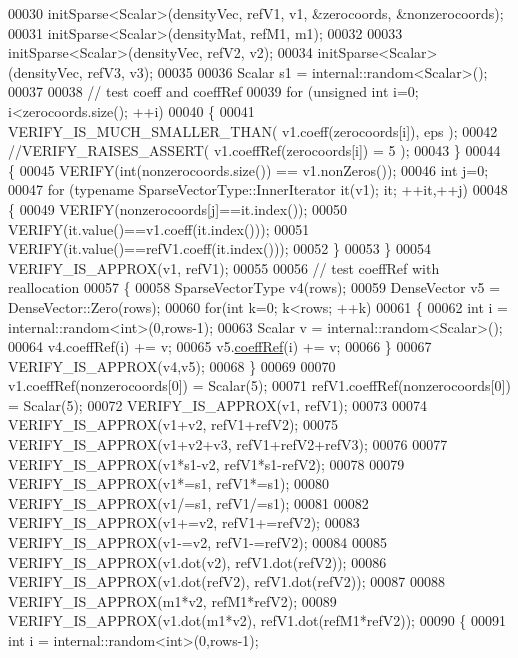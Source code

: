 \begin{DoxyCode}
00030   initSparse<Scalar>(densityVec, refV1, v1, &zerocoords, &nonzerocoords);
00031   initSparse<Scalar>(densityMat, refM1, m1);
00032 
00033   initSparse<Scalar>(densityVec, refV2, v2);
00034   initSparse<Scalar>(densityVec, refV3, v3);
00035 
00036   Scalar s1 = internal::random<Scalar>();
00037 
00038   \textcolor{comment}{// test coeff and coeffRef}
00039   \textcolor{keywordflow}{for} (\textcolor{keywordtype}{unsigned} \textcolor{keywordtype}{int} i=0; i<zerocoords.size(); ++i)
00040   \{
00041     VERIFY\_IS\_MUCH\_SMALLER\_THAN( v1.coeff(zerocoords[i]), eps );
00042     \textcolor{comment}{//VERIFY\_RAISES\_ASSERT( v1.coeffRef(zerocoords[i]) = 5 );}
00043   \}
00044   \{
00045     VERIFY(\textcolor{keywordtype}{int}(nonzerocoords.size()) == v1.nonZeros());
00046     \textcolor{keywordtype}{int} j=0;
00047     \textcolor{keywordflow}{for} (\textcolor{keyword}{typename} SparseVectorType::InnerIterator it(v1); it; ++it,++j)
00048     \{
00049       VERIFY(nonzerocoords[j]==it.index());
00050       VERIFY(it.value()==v1.coeff(it.index()));
00051       VERIFY(it.value()==refV1.coeff(it.index()));
00052     \}
00053   \}
00054   VERIFY\_IS\_APPROX(v1, refV1);
00055   
00056   \textcolor{comment}{// test coeffRef with reallocation}
00057   \{
00058     SparseVectorType v4(rows);
00059     DenseVector v5 = DenseVector::Zero(rows);
00060     \textcolor{keywordflow}{for}(\textcolor{keywordtype}{int} k=0; k<rows; ++k)
00061     \{
00062       \textcolor{keywordtype}{int} i = internal::random<int>(0,rows-1);
00063       Scalar v = internal::random<Scalar>();
00064       v4.coeffRef(i) += v;
00065       v5.\hyperlink{class_eigen_1_1_plain_object_base_a25626a55b26a4323565f79d1b7c48ea8}{coeffRef}(i) += v;
00066     \}
00067     VERIFY\_IS\_APPROX(v4,v5);
00068   \}
00069 
00070   v1.coeffRef(nonzerocoords[0]) = Scalar(5);
00071   refV1.coeffRef(nonzerocoords[0]) = Scalar(5);
00072   VERIFY\_IS\_APPROX(v1, refV1);
00073 
00074   VERIFY\_IS\_APPROX(v1+v2, refV1+refV2);
00075   VERIFY\_IS\_APPROX(v1+v2+v3, refV1+refV2+refV3);
00076 
00077   VERIFY\_IS\_APPROX(v1*s1-v2, refV1*s1-refV2);
00078 
00079   VERIFY\_IS\_APPROX(v1*=s1, refV1*=s1);
00080   VERIFY\_IS\_APPROX(v1/=s1, refV1/=s1);
00081 
00082   VERIFY\_IS\_APPROX(v1+=v2, refV1+=refV2);
00083   VERIFY\_IS\_APPROX(v1-=v2, refV1-=refV2);
00084 
00085   VERIFY\_IS\_APPROX(v1.dot(v2), refV1.dot(refV2));
00086   VERIFY\_IS\_APPROX(v1.dot(refV2), refV1.dot(refV2));
00087 
00088   VERIFY\_IS\_APPROX(m1*v2, refM1*refV2);
00089   VERIFY\_IS\_APPROX(v1.dot(m1*v2), refV1.dot(refM1*refV2));
00090   \{
00091     \textcolor{keywordtype}{int} i = internal::random<int>(0,rows-1);

\end{DoxyCode}
